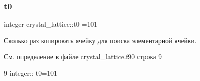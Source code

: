 \subsubsection{\texorpdfstring{t0}{t0}}
{\footnotesize\ttfamily integer crystal\+\_\+lattice\+::t0 =101}



Сколько раз копировать ячейку для поиска элементарной ячейки. 



См. определение в файле crystal\+\_\+lattice.\+f90 строка 9


\begin{DoxyCode}
9 \textcolor{keywordtype}{integer}:: t0=101
\end{DoxyCode}
